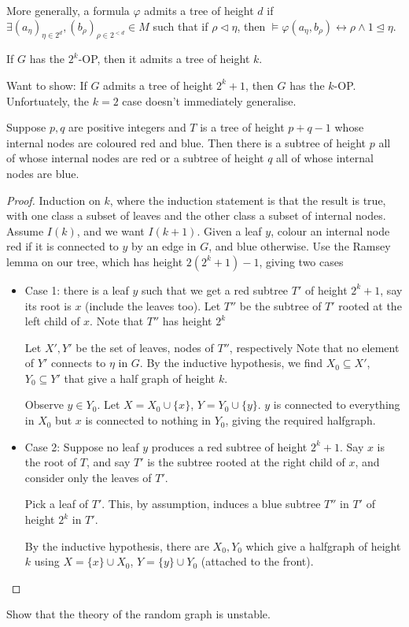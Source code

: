 \documentclass{article}
\let\models\vDash
\begin{document}
More generally, a formula $\varphi$ admits a tree of height $d$ if $\exists (a_\eta)_{\eta \in 2^d}, (b_\rho)_{\rho \in 2^{< d}} \in M$ such that if $\rho \lhd \eta$, then $\models \varphi(a_\eta, b_\rho) \leftrightarrow \rho \land 1 \unlhd \eta$.

If $G$ has the $2^k$-OP, then it admits a tree of height $k$.

Want to show: If $G$ admits a tree of height $2^k + 1$, then $G$ has the $k$-OP.
Unfortuately, the $k=2$ case doesn't immediately generalise.
\begin{exercise}
  Suppose $p,q$ are positive integers and $T$ is a tree of height $p+q-1$ whose internal nodes are coloured red and blue.
  Then there is a subtree of height $p$ all of whose internal nodes are red or a subtree of height $q$ all of whose internal nodes are blue.
\end{exercise}
\begin{proof}
  Induction on $k$, where the induction statement is that the result is true, with one class a subset of leaves and the other class a subset of internal nodes.
  Assume $I(k)$, and we want $I(k+1)$.
  Given a leaf $y$, colour an internal node red if it is connected to $y$ by an edge in $G$, and blue otherwise.
  Use the Ramsey lemma on our tree, which has height $2(2^k + 1) - 1$, giving two cases
  \begin{itemize}
    \item Case 1: there is a leaf $y$ such that we get a red subtree $T'$ of height $2^k + 1$, say its root is $x$ (include the leaves too).
      Let $T''$ be the subtree of $T'$ rooted at the left child of $x$.
      Note that $T''$ has height $2^k$

      Let $X', Y'$ be the set of leaves, nodes of $T''$, respectively
      Note that no element of $Y'$ connects to $\eta$ in $G$.
      By the inductive hypothesis, we find $X_0 \subseteq X'$, $Y_0 \subseteq Y'$ that give a half graph of height $k$.

      Observe $y \in Y_0$. Let $X = X_0 \cup \{x\}$, $Y = Y_0 \cup \{y\}$.
      $y$ is connected to everything in $X_0$ but $x$ is connected to nothing in $Y_0$, giving the required halfgraph.
    \item Case 2: Suppose no leaf $y$ produces a red subtree of height $2^k + 1$.
      Say $x$ is the root of $T$, and say $T'$ is the subtree rooted at the right child of $x$, and consider only the leaves of $T'$.

      Pick a leaf of $T'$. This, by assumption, induces a blue subtree $T''$ in $T'$ of height $2^k$ in $T'$.

      By the inductive hypothesis, there are $X_0,Y_0$ which give a halfgraph of height $k$ using $X = \{x\} \cup X_0$, $Y = \{y\} \cup Y_0$ (attached to the front). \qedhere
  \end{itemize}
\end{proof}
\begin{exercise}
  Show that the theory of the random graph is unstable.
\end{exercise}
\end{document}
